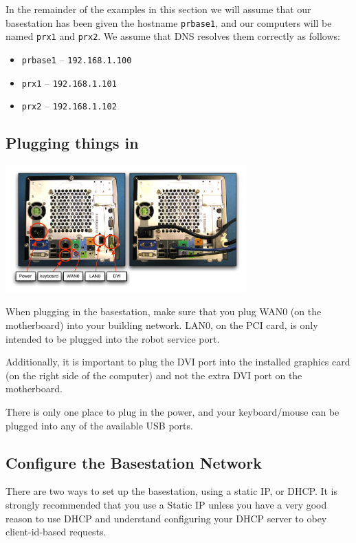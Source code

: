 In the remainder of the examples in this section we will assume that
our basestation has been given the hostname \texttt{prbase1}, and our
computers will be named \texttt{prx1} and \texttt{prx2}.  We assume
that DNS resolves them correctly as follows:

\begin{itemize}
\item \texttt{prbase1} -- \texttt{192.168.1.100}
\item \texttt{prx1} -- \texttt{192.168.1.101}
\item \texttt{prx2} -- \texttt{192.168.1.102}
\end{itemize}

\subsection{Plugging things in}
\includegraphics[width=350px]{images/pr2_basestation_plugs.pdf}

When plugging in the basestation, make sure that you plug WAN0 (on the
motherboard) into your building network.  LAN0, on the PCI card, is
only intended to be plugged into the robot service port.

Additionally, it is important to plug the DVI port into the installed
graphics card (on the right side of the computer) and not the extra
DVI port on the motherboard.

There is only one place to plug in the power, and your keyboard/mouse
can be plugged into any of the available USB ports.

\subsection{Configure the Basestation Network}

There are two ways to set up the basestation, using a static IP, or
DHCP.  It is strongly recommended that you use a Static IP unless you
have a very good reason to use DHCP and understand configuring your
DHCP server to obey client-id-based requests.

